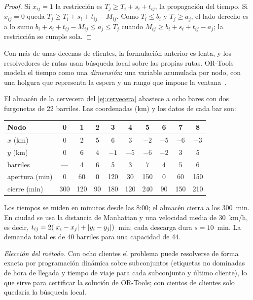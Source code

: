 \begin{proof}
Si $x_{ij}=1$ la restricción es $T_j\ge T_i+s_i+t_{ij}$, la propagación del tiempo. Si $x_{ij}=0$ queda $T_j\ge T_i+s_i+t_{ij}-M_{ij}$. Como $T_i\le b_i$ y $T_j\ge a_j$, el lado derecho es a lo sumo $b_i+s_i+t_{ij}-M_{ij}\le a_j\le T_j$ cuando $M_{ij}\ge b_i+s_i+t_{ij}-a_j$; la restricción se cumple sola.
\end{proof}

Con más de unas decenas de clientes, la formulación anterior es lenta, y los resolvedores de rutas usan búsqueda local sobre las propias rutas. OR-Tools modela el tiempo como una \emph{dimensión}: una variable acumulada por nodo, con una holgura que representa la espera y un rango que impone la ventana~\cite{ortools-vrptw}.

\begin{ejemplo}\label{ej:vrptw}
El almacén de la cervecera del \cref{ej:cervecera} abastece a ocho bares con dos furgonetas de 22 barriles. Las coordenadas (km) y los datos de cada bar son:
\begin{center}\small
\setlength{\tabcolsep}{4pt}
\begin{tabular}{@{}lccccccccc@{}}
\toprule
Nodo & 0 & 1 & 2 & 3 & 4 & 5 & 6 & 7 & 8 \\
\midrule
$x$ (km) & 0 & 2 & 5 & 6 & 3 & $-2$ & $-5$ & $-6$ & $-3$ \\
$y$ (km) & 0 & 6 & 4 & $-1$ & $-5$ & $-6$ & $-2$ & 3 & 5 \\
barriles & --- & 4 & 6 & 5 & 3 & 7 & 4 & 5 & 6 \\
apertura (min) & 0 & 60 & 0 & 120 & 30 & 150 & 0 & 60 & 150 \\
cierre (min) & 300 & 120 & 90 & 180 & 120 & 240 & 90 & 150 & 210 \\
\bottomrule
\end{tabular}
\end{center}
Los tiempos se miden en minutos desde las 8:00; el almacén cierra a los 300~min. En ciudad se usa la distancia de Manhattan y una velocidad media de 30~km/h, es decir, $t_{ij}=2(\lvert x_i-x_j\rvert+\lvert y_i-y_j\rvert)$~min; cada descarga dura $s=10$~min. La demanda total es de 40 barriles para una capacidad de 44.

\emph{Elección del método.} Con ocho clientes el problema puede resolverse de forma exacta por programación dinámica sobre subconjuntos (etiquetas no dominadas de hora de llegada y tiempo de viaje para cada subconjunto y último cliente), lo que sirve para certificar la solución de OR-Tools; con cientos de clientes solo quedaría la búsqueda local.


\end{ejemplo}
